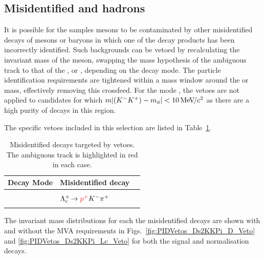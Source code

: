 \subsection{Misidentified \D and \Lc hadrons}
\label{sec:pidvetos}

It is possible for the samples \Dsp mesons to be contaminated by other misidentified decays of \Dp mesons or \Lc baryons in which one of the decay products has been incorrectly identified.
Such backgrounds can be vetoed by recalculating the invariant mass of the \Dsp meson, swapping the mass hypothesis of the ambiguous track to that of the \kaon, \pion or \proton, depending on the decay mode. 
The particle identification requirements are tightened within a mass window around the \Dp or \Lc mass, effectively removing this crossfeed. For the mode \decay{\Dsp}{\Kp\Km\pip}, the vetoes are not applied to candidates for which $m|({{K}^-}{{K}^+})-m_{\phi}| < 10{\mathrm{\,Me\kern -0.1em V\!/}c^2}$ as there are a high purity of \decay{\Dsp}{\Kp\Km\pip} decays in this region.

The specific vetoes included in this selection are listed in Table~\ref{table:pidvetos}. 
\begin{table}[!ht]
\centering
\begin{tabular}{ l l l }
\hline
Decay Mode & Misidentified decay\\
\hline
\decay{\Dsp}{{\color{Red}\Kp}\Km\pip}   & \decay{\Dp}{{\color{Red}\pip}\Km\pip}    \\
                           & $\decay{\Lc}{{\color{Red}\Pp^{+}}\Km\pip}$     \\
\hline
\decay{\Dsp}{{\color{Red}\Kp}\pim\pip}  & \decay{\Dp}{{\color{Red}\pip}\pim\pip}   \\

\hline
\end{tabular}
\caption{Misidentified decays targeted by vetoes. The ambiguous track is highlighted in red in each case.}
\label{table:pidvetos}

\end{table}
The invariant mass distributions for each the misidentified \decay{\Dsp}{\Kp\Km\pip} decays are shown with and without the MVA requirements in Figs.~\ref{fig:PIDVetos_Ds2KKPi_D_Veto} and \ref{fig:PIDVetos_Ds2KKPi_Lc_Veto} for both the signal \decay{\Bp}{\Dsp\phiz} and normalisation \decay{\Bp}{\Dsp\Dzb} decays.



